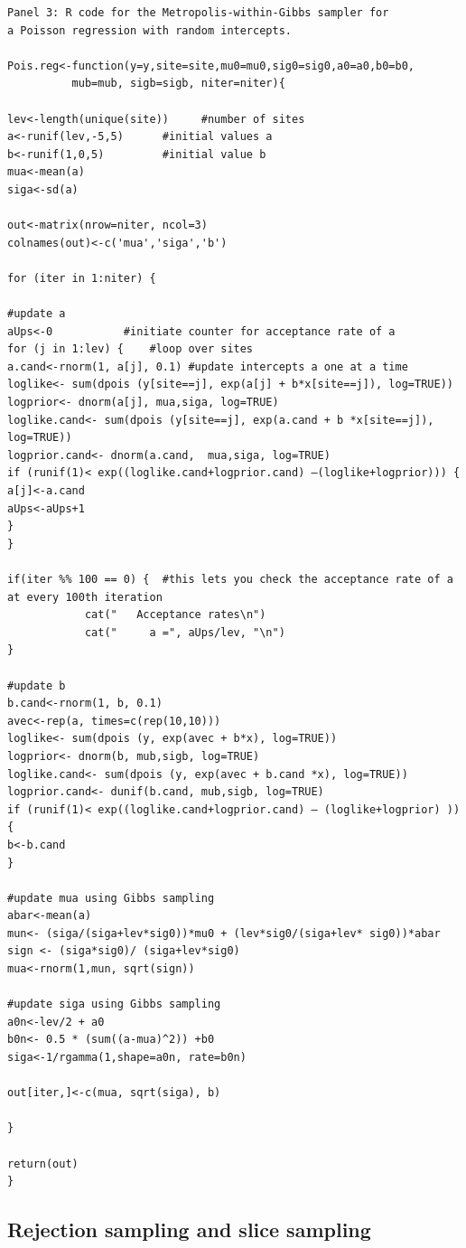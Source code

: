 {\small
\begin{verbatim}
Panel 3: R code for the Metropolis-within-Gibbs sampler for
a Poisson regression with random intercepts.

Pois.reg<-function(y=y,site=site,mu0=mu0,sig0=sig0,a0=a0,b0=b0,
          mub=mub, sigb=sigb, niter=niter){

lev<-length(unique(site))     #number of sites
a<-runif(lev,-5,5)		#initial values a
b<-runif(1,0,5)			#initial value b
mua<-mean(a)
siga<-sd(a)

out<-matrix(nrow=niter, ncol=3)
colnames(out)<-c('mua','siga','b')

for (iter in 1:niter) {

#update a
aUps<-0			  #initiate counter for acceptance rate of a
for (j in 1:lev) { 	  #loop over sites
a.cand<-rnorm(1, a[j], 0.1)	#update intercepts a one at a time
loglike<- sum(dpois (y[site==j], exp(a[j] + b*x[site==j]), log=TRUE))
logprior<- dnorm(a[j], mua,siga, log=TRUE)
loglike.cand<- sum(dpois (y[site==j], exp(a.cand + b *x[site==j]), log=TRUE))
logprior.cand<- dnorm(a.cand,  mua,siga, log=TRUE)
if (runif(1)< exp((loglike.cand+logprior.cand) –(loglike+logprior))) {
a[j]<-a.cand
aUps<-aUps+1
}
}

if(iter %% 100 == 0) {  #this lets you check the acceptance rate of a at every 100th iteration
            cat("   Acceptance rates\n")
            cat("     a =", aUps/lev, "\n")
}

#update b
b.cand<-rnorm(1, b, 0.1)
avec<-rep(a, times=c(rep(10,10)))
loglike<- sum(dpois (y, exp(avec + b*x), log=TRUE))
logprior<- dnorm(b, mub,sigb, log=TRUE)
loglike.cand<- sum(dpois (y, exp(avec + b.cand *x), log=TRUE))
logprior.cand<- dunif(b.cand, mub,sigb, log=TRUE)
if (runif(1)< exp((loglike.cand+logprior.cand) – (loglike+logprior) )) {
b<-b.cand
}

#update mua using Gibbs sampling
abar<-mean(a)
mun<- (siga/(siga+lev*sig0))*mu0 + (lev*sig0/(siga+lev* sig0))*abar
sign <- (siga*sig0)/ (siga+lev*sig0)
mua<-rnorm(1,mun, sqrt(sign))

#update siga using Gibbs sampling
a0n<-lev/2 + a0
b0n<- 0.5 * (sum((a-mua)^2)) +b0
siga<-1/rgamma(1,shape=a0n, rate=b0n)

out[iter,]<-c(mua, sqrt(siga), b)

}

return(out)
}
\end{verbatim}
}

\subsection{Rejection sampling and slice sampling }

